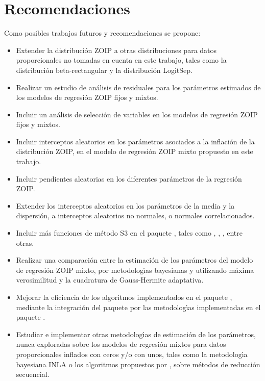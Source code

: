\section{Recomendaciones}

Como posibles trabajos futuros y recomendaciones se propone:

\begin{itemize}
	\item Extender la distribuci\'{o}n ZOIP a otras distribuciones para datos proporcionales no tomadas en cuenta en este trabajo, tales como la distribuci\'{o}n beta-rectangular y la distribuci\'{o}n LogitSep.
	\item Realizar un estudio de an\'{a}lisis de residuales para los par\'{a}metros estimados de los modelos de regresi\'{o}n ZOIP fijos y mixtos.
	\item Incluir un an\'{a}lisis de selecci\'{o}n de variables en los modelos de regresi\'{o}n ZOIP fijos y mixtos.
	\item Incluir interceptos aleatorios en los par\'{a}metros asociados a la inflaci\'{o}n de la distribuci\'{o}n ZOIP, en el modelo de regresi\'{o}n ZOIP mixto propuesto en este trabajo.
\item Incluir pendientes aleatorias en los diferentes par\'{a}metros de la regresi\'{o}n ZOIP.
	\item Extender los interceptos aleatorios en los par\'{a}metros de la media y la dispersi\'{o}n, a interceptos aleatorios no normales, o normales correlacionados.
	\item Incluir m\'{a}s funciones de m\'{e}todo S3 en el paquete , tales como ,  , , entre otras.
	\item Realizar una comparaci\'{o}n entre la estimaci\'{o}n de los par\'{a}metros del modelo de regresi\'{o}n ZOIP mixto, por metodolog\'{\i}as bayesianas y utilizando m\'{a}xima verosimilitud y la cuadratura de Gauss-Hermite adaptativa.
		\item Mejorar la eficiencia de los algoritmos implementados en el paquete , mediante la integraci\'{o}n del paquete  por las metodolog\'{\i}as implementadas en el paquete .
	\item Estudiar e implementar otras metodolog\'{\i}as de estimaci\'{o}n de los par\'{a}metros, nunca exploradas sobre los modelos de regresi\'{o}n mixtos para datos proporcionales inflados con ceros y/o con unos, tales como la metodolog\'{\i}a bayesiana INLA o los algoritmos propuestos por \cite{Ogden1}, sobre m\'{e}todos de reducci\'{o}n secuencial. 

\end{itemize}
